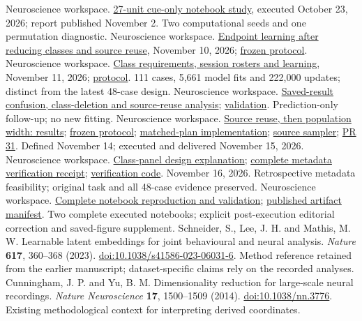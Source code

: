 \documentclass[10pt,a4paper]{article}
\newcommand{\repo}[2]{\href{https://github.com/Hong-yiii/neuro_science/blob/a0ca80180e2bb52b90e499357d3d6965b26806da/#1}{#2}}
\newcommand{\panelrepo}[2]{\href{https://github.com/Hong-yiii/neuro_science/blob/082b5e1a3cb9a87bc22a9ce80006d2e882adc404/#1}{#2}}
\begin{document}
\begin{thebibliography}{99}
 Neuroscience workspace. \repo{docs/reports/cebra-27unit-notebooks-20261023/README.md}{27-unit cue-only notebook study}, executed October 23, 2026; report published November 2. Two computational seeds and one permutation diagnostic.
 Neuroscience workspace. \repo{docs/reports/source-support-ablation-20261110/README.md}{Endpoint learning after reducing classes and source reuse}, November 10, 2026; \repo{docs/source-support-protocol-20261110.md}{frozen protocol}.
 Neuroscience workspace. \repo{docs/reports/population-grid-20261111/README.md}{Class requirements, session rosters and learning}, November 11, 2026; \repo{docs/population-grid-protocol-20261111.md}{protocol}. 111 cases, 5,661 model fits and 222,000 updates; distinct from the latest 48-case design.
 Neuroscience workspace. \repo{docs/reports/population-grid-20261111/error-analysis.md}{Saved-result confusion, class-deletion and source-reuse analysis}; \repo{docs/reports/population-grid-20261111/error-analysis-validation.md}{validation}. Prediction-only follow-up; no new fitting.
 Neuroscience workspace. \repo{docs/experiments/source-reuse-width-20261114/README.md}{Source reuse, then population width: results}; \repo{docs/experiments/source-reuse-width-20261114/protocol.md}{frozen protocol}; \repo{experiments/source_reuse_width_20261114/study.py}{matched-plan implementation}; \repo{src/neuro/pseudopopulation.py}{source sampler}; \href{https://github.com/Hong-yiii/neuro_science/pull/31}{PR 31}. Defined November 14; executed and delivered November 15, 2026.
 Neuroscience workspace. \panelrepo{docs/experiments/source-reuse-width-20261114/class-panel-20261116.md}{Class-panel design explanation}; \panelrepo{docs/experiments/source-reuse-width-20261114/class-panel-metadata-20261116.json}{complete metadata verification receipt}; \panelrepo{docs/experiments/source-reuse-width-20261114/verify_class_panel_20261116.py}{verification code}. November 16, 2026. Retrospective metadata feasibility; original task and all 48-case evidence preserved.
 Neuroscience workspace. \repo{docs/experiments/source-reuse-width-20261114/notebook-validation-20261115.md}{Complete notebook reproduction and validation}; \repo{experiments/source_reuse_width_20261114/walkthrough_20261115/published/manifest.json}{published artifact manifest}. Two complete executed notebooks; explicit post-execution editorial correction and saved-figure supplement.
 Schneider, S., Lee, J. H. and Mathis, M. W. Learnable latent embeddings for joint behavioural and neural analysis. \emph{Nature} \textbf{617}, 360--368 (2023). \href{https://doi.org/10.1038/s41586-023-06031-6}{doi:10.1038/s41586-023-06031-6}. Method reference retained from the earlier manuscript; dataset-specific claims rely on the recorded analyses.
 Cunningham, J. P. and Yu, B. M. Dimensionality reduction for large-scale neural recordings. \emph{Nature Neuroscience} \textbf{17}, 1500--1509 (2014). \href{https://doi.org/10.1038/nn.3776}{doi:10.1038/nn.3776}. Existing methodological context for interpreting derived coordinates.
\end{thebibliography}
\endgroup
\end{document}

